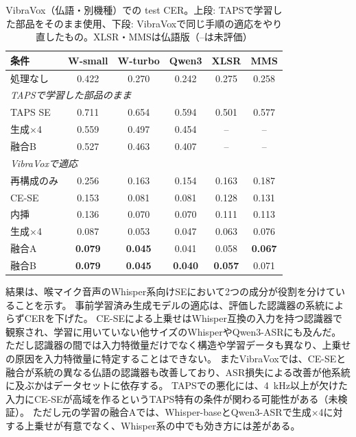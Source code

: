 \documentclass[xelatex,ja=standard,a4paper,twocolumn,10pt]{bxjsarticle}
\makeatletter
\renewcommand{\section}{\@startsection{section}{1}{\z@}{1.0ex plus .3ex}{.5ex}{\normalfont\large\sffamily\bfseries}}
\makeatother
\begin{document}
\begin{table}[t]
  \centering
  \caption{VibraVox（仏語・別機種）での test CER。上段: TAPSで学習した部品をそのまま使用、下段: VibraVoxで同じ手順の適応をやり直したもの。XLSR・MMSは仏語版（--は未評価）}
  \label{tab:vbx}
  \footnotesize
  \setlength{\tabcolsep}{2.0pt}
  \begin{tabular}{lccccc}
    \toprule
    条件 & W-small & W-turbo & Qwen3 & XLSR & MMS \\
    \midrule
    処理なし & 0.422 & 0.270 & 0.242 & 0.275 & 0.258 \\
    \midrule
    \multicolumn{6}{l}{\textit{TAPSで学習した部品のまま}} \\
    TAPS SE & 0.711 & 0.654 & 0.594 & 0.501 & 0.577 \\
    生成×4 & 0.559 & 0.497 & 0.454 & -- & -- \\
    融合B & 0.527 & 0.463 & 0.407 & -- & -- \\
    \midrule
    \multicolumn{6}{l}{\textit{VibraVoxで適応}} \\
    再構成のみ & 0.256 & 0.163 & 0.154 & 0.163 & 0.187 \\
    CE-SE & 0.153 & 0.081 & 0.081 & 0.128 & 0.131 \\
    内挿 & 0.136 & 0.070 & 0.070 & 0.111 & 0.113 \\
    生成×4 & 0.087 & 0.053 & 0.047 & 0.063 & 0.076 \\
    融合A & \textbf{0.079} & \textbf{0.045} & 0.041 & 0.058 & \textbf{0.067} \\
    融合B & \textbf{0.079} & \textbf{0.045} & \textbf{0.040} & \textbf{0.057} & 0.071 \\
    \bottomrule
  \end{tabular}
\end{table}

\section{考察}
結果は、喉マイク音声のWhisper系向けSEにおいて2つの成分が役割を分けていることを示す。
事前学習済み生成モデルの適応は、評価した認識器の系統によらずCERを下げた。
CE-SEによる上乗せはWhisper互換の入力を持つ認識器で観察され、学習に用いていない他サイズのWhisperやQwen3-ASRにも及んだ。
ただし認識器の間では入力特徴量だけでなく構造や学習データも異なり、上乗せの原因を入力特徴量に特定することはできない。
またVibraVoxでは、CE-SEと融合が系統の異なる仏語の認識器も改善しており、ASR損失による改善が他系統に及ぶかはデータセットに依存する。
TAPSでの悪化には、4~kHz以上が欠けた入力にCE-SEが高域を作るというTAPS特有の条件が関わる可能性がある（未検証）。
ただし元の学習の融合Aでは、Whisper-baseとQwen3-ASRで生成×4に対する上乗せが有意でなく、Whisper系の中でも効き方には差がある。
\end{document}
